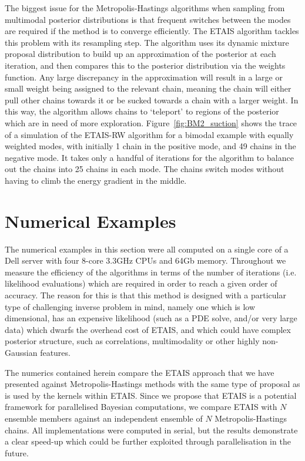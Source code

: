 \documentclass[final]{siamltex}
\begin{document}
The biggest issue for the Metropolis-Hastings algorithms when sampling
from multimodal posterior distributions is that frequent switches
between the modes are required if the method is to converge
efficiently. The ETAIS algorithm tackles this problem with its
resampling step. The algorithm uses its dynamic mixture proposal distribution to build up an
approximation of the posterior at each iteration, and then compares
this to the posterior distribution via the weights function. Any large
discrepancy in the approximation will result in a large or small
weight being assigned to the relevant chain, meaning the chain will
either pull other chains towards it or be sucked towards a chain with
a larger weight. In this way, the algorithm allows chains to
`teleport' to regions of the posterior which are in need of more
exploration. Figure~\ref{fig:BM2_suction} shows the trace of a
simulation of the ETAIS-RW algorithm for a bimodal example with
equally weighted modes, with initially 1 chain in the
positive mode, and 49 chains in the negative mode. It takes only a
handful of iterations for the algorithm to balance out the chains into
25 chains in each mode. The chains switch modes without having to
climb the energy gradient in the middle.



\section{Numerical Examples}\label{Sec:Num}
The numerical examples in this section were all computed on a single
core of a Dell
server with four 8-core 3.3GHz CPUs and 64Gb memory. Throughout we
measure the efficiency of the algorithms in terms of the number of
iterations (i.e. likelihood evaluations) which are required in order
to reach a given order of accuracy. The reason for this is that this
method is designed with a particular type of challenging inverse
problem in mind, namely one which is low dimensional, has an expensive
likelihood (such as a PDE solve, and/or very large data) which dwarfs
the overhead cost of ETAIS, and which could have complex posterior
structure, such as correlations, multimodality or other highly
non-Gaussian features.

{\red The numerics contained herein compare the ETAIS approach that we
  have presented against Metropolis-Hastings methods with
  the same type of proposal as is used by the kernels within
  ETAIS. Since we propose that ETAIS is a potential framework for
  parallelised Bayesian computations, we compare ETAIS with $N$
  ensemble members against an independent ensemble of $N$
  Metropolis-Hastings chains. All implementations were
  computed in serial, but the results demonstrate a clear speed-up
  which could be further exploited through parallelisation in the future.
  }
\end{document}
